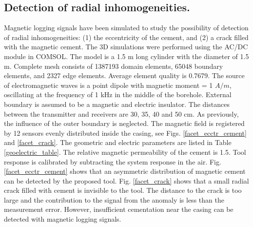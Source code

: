 \documentclass[10pt,twoside]{article}
\begin{document}
\subsection{Detection of radial inhomogeneities.}
Magnetic logging signals have been simulated to study the possibility of detection of radial inhomogeneities: (1) the eccentricity of the cement, and (2) a crack filled with the magnetic cement. The 3D simulations were performed using the AC/DC module in COMSOL. {The model is a 1.5 m long cylinder with the diameter of 1.5 m. Complete mesh consists of 1387193 domain elements, 65048 boundary elements, and 2327 edge elements. Average element quality is 0.7679.  The source of electromagnetic waves is a point dipole with magnetic moment = 1 $A/m$, oscillating at the frequency of 1 kHz in the middle of the borehole. External boundary is assumed to be a magnetic and electric insulator.}  The distances between the transmitter and receivers are 30, 35, 40 and 50 cm. As previously, the influence of the outer boundary is neglected. The magnetic field is registered by 12 sensors evenly distributed inside the casing, see Figs. \ref{facet_ecctr_cement} and  \ref{facet_crack}. The geometric and electric parameters are listed in Table \ref{geoelectric_table}. The relative magnetic permeability of the cement is 1.5. Tool response is calibrated by subtracting the system response in the air. Fig. \ref{facet_ecctr_cement} shows that an asymmetric distribution of magnetic cement can be detected by the proposed tool. Fig. \ref{facet_crack} shows that a small radial crack filled with cement is invisible to the tool. The distance to the crack is too large and the contribution to the signal from the anomaly is less than the measurement error. However, insufficient cementation near the casing can be detected with magnetic logging signals.
\end{document}
